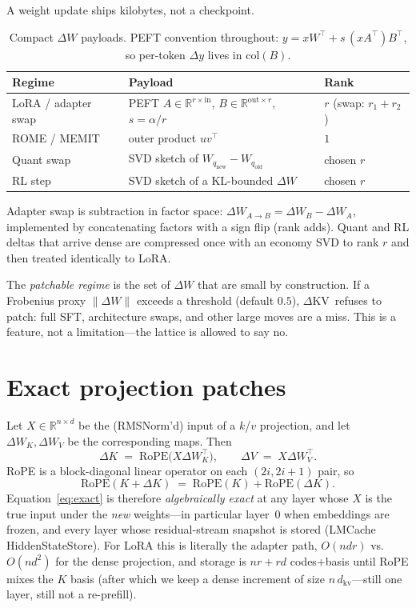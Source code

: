 \documentclass{article}
\newcommand{\dkv}{$\Delta$KV}
\begin{document}
A weight update ships kilobytes, not a checkpoint.

\begin{table}[h]
\centering
\caption{Compact $\Delta W$ payloads. PEFT convention throughout:
$y=xW^\top + s\,(xA^\top)B^\top$, so per-token $\Delta y$ lives in
$\mathrm{col}(B)$.}
\label{tab:delta}
\small
\begin{tabular}{@{}lll@{}}
\toprule
Regime & Payload & Rank \\
\midrule
LoRA / adapter swap & PEFT $A\in\mathbb{R}^{r\times\mathrm{in}}$, $B\in\mathbb{R}^{\mathrm{out}\times r}$, $s=\alpha/r$
  & $r$ (swap: $r_1+r_2$) \\
ROME / MEMIT & outer product $uv^\top$ & $1$ \\
Quant swap & SVD sketch of $W_{q_{\mathrm{new}}}-W_{q_{\mathrm{old}}}$ & chosen $r$ \\
RL step & SVD sketch of a KL-bounded $\Delta W$ & chosen $r$ \\
\bottomrule
\end{tabular}
\end{table}

Adapter swap is subtraction in factor space:
$\Delta W_{A\to B}=\Delta W_B-\Delta W_A$, implemented by concatenating
factors with a sign flip (rank adds).
Quant and RL deltas that arrive dense are compressed once with an economy
SVD to rank $r$ and then treated identically to LoRA.

The \emph{patchable regime} is the set of $\Delta W$ that are small by
construction.
If a Frobenius proxy $\|\Delta W\|$ exceeds a threshold
(default $0.5$), \dkv\ refuses to patch: full SFT, architecture swaps,
and other large moves are a miss.
This is a feature, not a limitation---the lattice is allowed to say no.

\section{Exact projection patches}
\label{sec:exact}

Let $X\in\mathbb{R}^{n\times d}$ be the (RMSNorm'd) input of a
$k$/$v$ projection, and let $\Delta W_K,\Delta W_V$ be the corresponding
maps.
Then
\begin{equation}
  \label{eq:exact}
  \Delta K \;=\; \mathrm{RoPE}\!\bigl(X\Delta W_K^\top\bigr),\qquad
  \Delta V \;=\; X\Delta W_V^\top.
\end{equation}
RoPE is a block-diagonal linear operator on each $(2i,2i{+}1)$ pair, so
\begin{equation}
  \mathrm{RoPE}(K+\Delta K)\;=\;\mathrm{RoPE}(K)+\mathrm{RoPE}(\Delta K).
\end{equation}
Equation~\eqref{eq:exact} is therefore \emph{algebraically exact} at any
layer whose $X$ is the true input under the \emph{new} weights---in
particular layer~$0$ when embeddings are frozen, and every layer whose
residual-stream snapshot is stored (LMCache HiddenStateStore).
For LoRA this is literally the adapter path, $O(ndr)$ vs.\ $O(nd^2)$ for
the dense projection, and storage is $nr+rd$ codes+basis until RoPE mixes
the $K$ basis (after which we keep a dense increment of size
$n\,d_{\mathrm{kv}}$---still one layer, still not a re-prefill).
\end{document}
